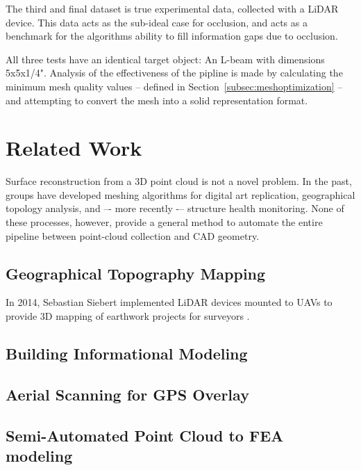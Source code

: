 \documentclass[12pt]{drexelthesis}
\let\Oldsection\section
\renewcommand{\section}{\FloatBarrier\Oldsection}
\let\Oldsubsection\subsection
\renewcommand{\subsection}{\FloatBarrier\Oldsubsection}
\begin{document}
The third and final dataset is true experimental data, collected with a LiDAR device. This data acts as the sub-ideal case for occlusion, and acts as a benchmark for the algorithms ability to fill information gaps due to occlusion.

All three tests have an identical target object: An L-beam with dimensions 5x5x1/4". Analysis of the effectiveness of the pipline is made by calculating the minimum mesh quality values -- defined in Section~\ref{subsec:meshoptimization} -- and attempting to convert the mesh into a solid representation format. 

\section{Related Work}
\label{sec:related}
Surface reconstruction from a 3D point cloud is not a novel problem. In the past, groups have developed meshing algorithms for digital art replication, geographical topology analysis, and –- more recently -– structure health monitoring. None of these processes, however, provide a general method to automate the entire pipeline between point-cloud collection and CAD geometry.

\subsection{Geographical Topography Mapping}
\label{subsec:topographymapping}

In 2014, Sebastian Siebert implemented LiDAR devices mounted to UAVs to provide 3D mapping of earthwork projects for surveyors \cite{RN48}.


\subsection{Building Informational Modeling}
\label{subsec:BIM}

\cite{RN30}
\subsection{Aerial Scanning for GPS Overlay}
\label{subsec:UAVscanning}
\subsection{Semi-Automated Point Cloud to FEA modeling}
\label{subsec:SemiFEA}
\cite{RN29} \cite{RN31} \cite{RN38} \cite{RN54}
\end{document}

